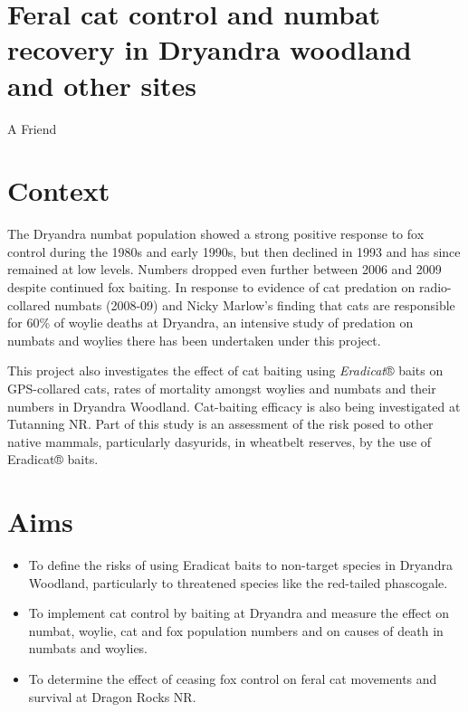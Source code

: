 \documentclass[version=last,
    paper=a4, %
    10pt, %
    usenames,
    dvipsnames,
    oneside, %
    headings=openany, %
    DIV=15 %
]{scrbook}
\begin{document}
\section*{Feral cat control and numbat recovery in Dryandra woodland and other
sites
}

A Friend


\section*{Context}
The Dryandra numbat population showed a strong positive response to fox
control during the 1980s and early 1990s, but then declined in 1993 and
has since remained at low levels. Numbers dropped even further between
2006 and 2009 despite continued fox baiting. In response to evidence of
cat predation on radio-collared numbats (2008-09) and Nicky Marlow's
finding that cats are responsible for 60\% of woylie deaths at Dryandra,
an intensive study of predation on numbats and woylies there has been
undertaken under this project.

This project also investigates the effect of cat baiting using
\emph{Eradicat}® baits on GPS-collared cats, rates of mortality amongst
woylies and numbats and their numbers in Dryandra Woodland. Cat-baiting
efficacy is also being investigated at Tutanning NR. Part of this study
is an assessment of the risk posed to other native mammals, particularly
dasyurids, in wheatbelt reserves, by the use of Eradicat® baits.



\section*{Aims}
\begin{itemize}
\itemsep1pt\parskip0pt
\item
  To define the risks of using Eradicat baits to non-target species in
  Dryandra Woodland, particularly to threatened species like the
  red-tailed phascogale.
\item
  To implement cat control by baiting at Dryandra and measure the effect
  on numbat, woylie, cat and fox population numbers and on causes of
  death in numbats and woylies.
\item
  To determine the effect of ceasing fox control on feral cat movements
  and survival at Dragon Rocks NR.
\end{itemize}
\end{document}
